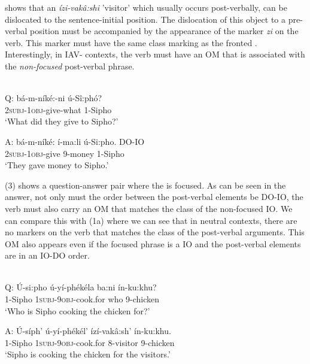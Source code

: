 \documentclass[output=paper
,newtxmath
,modfonts
,nonflat]{langsci/langscibook}
\begin{document}
 shows that an  \textit{ízi-vakâ:shi} 'visitor' which usually occurs post-verbally, can be dislocated to the sentence-initial position. The dislocation of this object to a pre-verbal position must be accompanied by the appearance of the marker \textit{zi} on the verb. This marker must have the same class marking as the fronted . Interestingly, in IAV- contexts, the verb must have an OM that is associated with the \textit{non-focused} post-verbal phrase.  

\ea\label{ex:selvanathan:3}
 \citep[4]{chengdowning2012}\\
Q: \gll bá-m-níké:-ni      ú-Sî:phó?\\ 
	\textsc{2subj}{}-\textsc{1obj}{}-give-what    1-Sipho\\ 
	\glt \-\hspace{0.5cm}`What did they give to Sipho?’

A: \gll bá-m-níké:      í-ma:li   ú-Si:pho.     DO-IO\\
\textsc{2subj}{}-\textsc{1obj}{}-give   9-money   1-Sipho\\
\glt    \-\hspace{0.5cm}`They gave money to Sipho.’ 
\z

(3) shows a question-answer pair where the  is focused. As can be seen in the answer, not only must the order between the post-verbal elements be DO-IO, the verb must also carry an OM that matches the class of the non-focused IO. We can compare this with (1a) where we can see that in neutral contexts, there are no markers on the verb that matches the class of the post-verbal arguments. This OM also appears even if the focused phrase is a IO and the post-verbal elements are in an IO-DO order. 

\ea\label{ex:selvanathan:4}
 \citep[4]{chengdowning2012}\\
Q: \gll  Ú-si:pho    ú-yí-phékéla        ba:ni   ín-ku:khu?\\
1-Sipho       \textsc{1subj}{}-\textsc{9obj}{}-cook.for  who    9-chicken\\ 
\glt \-\hspace{0.5cm}`Who is Sipho cooking the chicken for?’

A: \gll  Ú-síph’   ú-yí-phékél’              ízí-vakâ:sh’    ín-ku:khu.\\
	1-Sipho  \textsc{1subj}{}-\textsc{9obj}{}-cook.for    8-visitor    9-chicken\\
\glt \-\hspace{0.5cm}`Sipho is cooking the chicken for the visitors.’
\z
\end{document}
